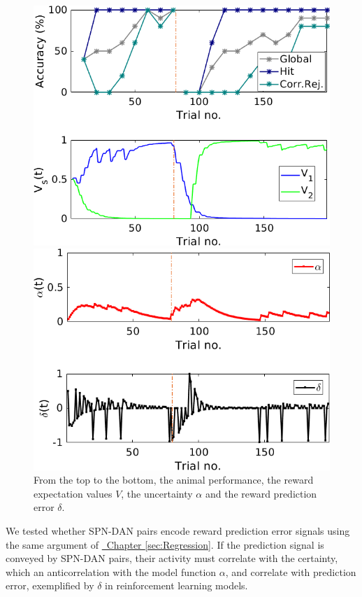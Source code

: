 \begin{figure}
    \centering
    \includegraphics[scale=0.7]{figures/PavPerfV2.png}
    
    \vspace{0.5cm}
    
    \includegraphics[scale=0.7]{figures/PavAlphaDelta1.png}
    \caption{From the top to the bottom, the animal performance, the reward expectation values $V$, the uncertainty $\alpha$ and the reward prediction error $\delta$.}
    \label{fig:PavRL_ex}
\end{figure}
We tested whether SPN-DAN pairs encode reward prediction error signals using the same argument of \hyperref[sec:Regression]{~Chapter \ref*{sec:Regression}}. If the prediction signal is conveyed by SPN-DAN pairs, their activity must correlate with the certainty, which an anticorrelation with the model function $\alpha$, and correlate with prediction error, exemplified by $\delta$ in reinforcement learning models.
